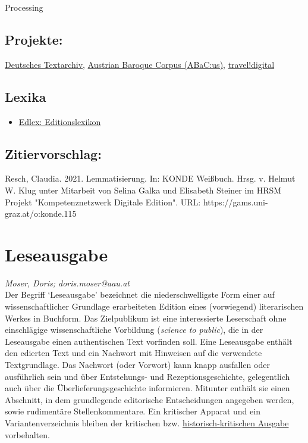 \documentclass{article}
\begin{document}
Processing\subsection*{Projekte:}\href{http://www.deutschestextarchiv.de/}{Deutsches Textarchiv}, \href{https://acdh.oeaw.ac.at/abacus/}{Austrian Baroque Corpus (ABaC:us)}, \href{https://traveldigital.acdh.oeaw.ac.at/}{travel!digital}\subsection*{Lexika}\begin{itemize}\item \href{https://edlex.de/index.php?title=Lemmatisierung}{Edlex: Editionslexikon}\end{itemize}\subsection*{Zitiervorschlag:}Resch, Claudia. 2021. Lemmatisierung. In: KONDE Weißbuch. Hrsg. v. Helmut W. Klug unter Mitarbeit von Selina Galka und Elisabeth Steiner im HRSM Projekt "Kompetenznetzwerk Digitale Edition". URL: https://gams.uni-graz.at/o:konde.115\newpage\section*{Leseausgabe} \emph{Moser, Doris; doris.moser@aau.at }\\
        
    Der Begriff ‘Leseausgabe’ bezeichnet die niederschwelligste Form einer auf wissenschaftlicher Grundlage erarbeiteten Edition eines (vorwiegend) literarischen Werkes in Buchform. Das Zielpublikum ist eine interessierte Leserschaft ohne einschlägige wissenschaftliche Vorbildung (\emph{science to public}), die in der Leseausgabe einen authentischen Text vorfinden soll. Eine Leseausgabe enthält den edierten Text und ein Nachwort mit Hinweisen auf die verwendete Textgrundlage. Das Nachwort (oder Vorwort) kann knapp ausfallen oder ausführlich sein und über Entstehungs- und Rezeptionsgeschichte, gelegentlich auch über die Überlieferungsgeschichte informieren. Mitunter enthält sie einen Abschnitt, in dem grundlegende editorische Entscheidungen angegeben werden, sowie rudimentäre Stellenkommentare. Ein kritischer Apparat und ein Variantenverzeichnis bleiben der kritischen bzw. \href{http://gams.uni-graz.at/o:konde.93}{historisch-kritischen Ausgabe} vorbehalten.\\
            
\end{document}
